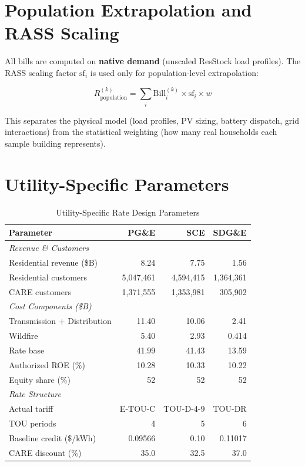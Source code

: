 \documentclass[11pt]{article}
\begin{document}
\section{Population Extrapolation and RASS Scaling}

All bills are computed on \textbf{native demand} (unscaled ResStock load profiles). The RASS scaling factor $\text{sf}_i$ is used only for population-level extrapolation:

\begin{equation}
R_{\text{population}}^{(k)} = \sum_i \text{Bill}_i^{(k)} \times \text{sf}_i \times w
\label{eq:population_revenue}
\end{equation}

This separates the physical model (load profiles, PV sizing, battery dispatch, grid interactions) from the statistical weighting (how many real households each sample building represents).

\section{Utility-Specific Parameters}

\begin{table}[htbp]
\centering
\caption{Utility-Specific Rate Design Parameters}
\label{tab:utility_params}
\begin{tabular}{l r r r}
\toprule
\textbf{Parameter} & \textbf{PG\&E} & \textbf{SCE} & \textbf{SDG\&E} \\
\midrule
\multicolumn{4}{l}{\textit{Revenue \& Customers}} \\
Residential revenue (\$B) & 8.24 & 7.75 & 1.56 \\
Residential customers & 5,047,461 & 4,594,415 & 1,364,361 \\
CARE customers & 1,371,555 & 1,353,981 & 305,902 \\
\midrule
\multicolumn{4}{l}{\textit{Cost Components (\$B)}} \\
Transmission + Distribution & 11.40 & 10.06 & 2.41 \\
Wildfire & 5.40 & 2.93 & 0.414 \\
Rate base & 41.99 & 41.43 & 13.59 \\
Authorized ROE (\%) & 10.28 & 10.33 & 10.22 \\
Equity share (\%) & 52 & 52 & 52 \\
\midrule
\multicolumn{4}{l}{\textit{Rate Structure}} \\
Actual tariff & E-TOU-C & TOU-D-4-9 & TOU-DR \\
TOU periods & 4 & 5 & 6 \\
Baseline credit (\$/kWh) & 0.09566 & 0.10 & 0.11017 \\
CARE discount (\%) & 35.0 & 32.5 & 37.0 \\
\bottomrule
\end{tabular}
\end{table}
\end{document}

